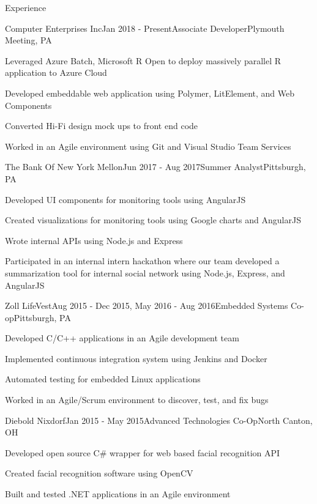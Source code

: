 \documentclass{resume} %
\begin{document}
\begin{rSection}{Experience}


\begin{rSubsection}{Computer Enterprises Inc}{Jan 2018 - Present}{Associate Developer}{Plymouth Meeting, PA}
\item Leveraged Azure Batch, Microsoft R Open to deploy massively parallel R application to Azure Cloud
\item Developed embeddable web application using Polymer, LitElement, and Web Components
\item Converted Hi-Fi design mock ups to front end code
\item Worked in an Agile environment using Git and Visual Studio Team Services
\end{rSubsection}

\begin{rSubsection}{The Bank Of New York Mellon}{Jun 2017 - Aug 2017}{Summer Analyst}{Pittsburgh, PA}
\item Developed UI components for monitoring tools using AngularJS
\item Created visualizations for monitoring tools using Google charts and AngularJS
\item Wrote internal APIs using Node.js and Express 
\item Participated in an internal intern hackathon where our team developed a summarization tool for internal social network using Node.js, Express, and AngularJS
\end{rSubsection}


\begin{rSubsection}{Zoll LifeVest}{Aug 2015 - Dec 2015, May 2016 - Aug 2016}{Embedded Systems Co-op}{Pittsburgh, PA}
\item Developed C/C++ applications in an Agile development team
\item Implemented continuous integration system using Jenkins and Docker
\item Automated testing for embedded Linux applications
\item Worked in an Agile/Scrum environment to discover, test, and fix bugs
\end{rSubsection}


\begin{rSubsection}{Diebold Nixdorf}{Jan 2015 - May 2015}{Advanced Technologies Co-Op}{North Canton, OH}
\item Developed open source C\# wrapper for web based facial recognition API
\item Created facial recognition software using OpenCV
\item Built and tested .NET applications in an Agile environment
\end{rSubsection}

\end{rSection}
\end{document}
